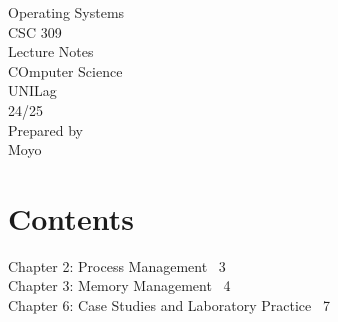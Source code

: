 \documentclass[12pt]{report}
\begin{document}
\begin{titlepage}
\thispagestyle{empty}
\centering
\vspace*{2cm}
{\LARGE Operating Systems}\\[1cm]
{\Large CSC 309}\\[1cm]
{\Large Lecture Notes}\\[1.5cm]
COmputer Science\\
UNILag\\
24/25\\[2cm]
Prepared by\\
Moyo
\end{titlepage}

\pagestyle{plain}
\chapter*{Contents}
\vspace{0.5em}
\noindent
Chapter 2: Process Management \dotfill\ 3\\[0.6em]
Chapter 3: Memory Management \dotfill\ 4\\[0.6em]
Chapter 6: Case Studies and Laboratory Practice \dotfill\ 7\\[0.6em]
\end{document}
